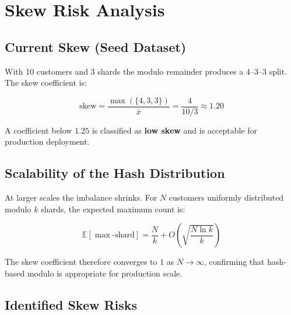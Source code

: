 \documentclass[12pt, a4paper]{article}
\renewcommand{\_}{\plainunderscore\allowbreak}
\begin{document}
\section{Skew Risk Analysis}

\subsection{Current Skew (Seed Dataset)}

With 10 customers and 3 shards the modulo remainder produces a $4$--$3$--$3$
split. The skew coefficient is:

\[
  \text{skew} = \frac{\max(\{4,3,3\})}{\bar{x}} = \frac{4}{10/3} \approx 1.20
\]

A coefficient below $1.25$ is classified as \textbf{low skew} and is
acceptable for production deployment.

\subsection{Scalability of the Hash Distribution}

At larger scales the imbalance shrinks. For $N$ customers uniformly
distributed modulo $k$ shards, the expected maximum count is:

\[
  \mathbb{E}[\max\text{-shard}] = \frac{N}{k} + O\!\left(\sqrt{\frac{N\ln k}{k}}\right)
\]

The skew coefficient therefore converges to $1$ as $N \to \infty$,
confirming that hash-based modulo is appropriate for production scale.

\subsection{Identified Skew Risks}
\end{document}
